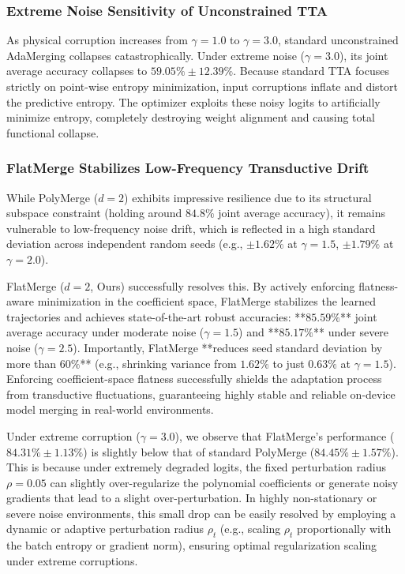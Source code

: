 \subsubsection{Extreme Noise Sensitivity of Unconstrained TTA}
As physical corruption increases from $\gamma=1.0$ to $\gamma=3.0$, standard unconstrained AdaMerging collapses catastrophically. 
Under extreme noise ($\gamma=3.0$), its joint average accuracy collapses to $59.05\% \pm 12.39\%$. 
Because standard TTA focuses strictly on point-wise entropy minimization, input corruptions inflate and distort the predictive entropy. 
The optimizer exploits these noisy logits to artificially minimize entropy, completely destroying weight alignment and causing total functional collapse.

\subsubsection{FlatMerge Stabilizes Low-Frequency Transductive Drift}
While PolyMerge ($d=2$) exhibits impressive resilience due to its structural subspace constraint (holding around $84.8\%$ joint average accuracy), it remains vulnerable to low-frequency noise drift, which is reflected in a high standard deviation across independent random seeds (e.g., $\pm 1.62\%$ at $\gamma=1.5$, $\pm 1.79\%$ at $\gamma=2.0$).

FlatMerge ($d=2$, Ours) successfully resolves this. 
By actively enforcing flatness-aware minimization in the coefficient space, FlatMerge stabilizes the learned trajectories and achieves state-of-the-art robust accuracies: **$85.59\%$** joint average accuracy under moderate noise ($\gamma=1.5$) and **$85.17\%$** under severe noise ($\gamma=2.5$). 
Importantly, FlatMerge **reduces seed standard deviation by more than $60\%$** (e.g., shrinking variance from $1.62\%$ to just $0.63\%$ at $\gamma=1.5$). 
Enforcing coefficient-space flatness successfully shields the adaptation process from transductive fluctuations, guaranteeing highly stable and reliable on-device model merging in real-world environments.

Under extreme corruption ($\gamma=3.0$), we observe that FlatMerge's performance ($84.31\% \pm 1.13\%$) is slightly below that of standard PolyMerge ($84.45\% \pm 1.57\%$). 
This is because under extremely degraded logits, the fixed perturbation radius $\rho = 0.05$ can slightly over-regularize the polynomial coefficients or generate noisy gradients that lead to a slight over-perturbation. 
In highly non-stationary or severe noise environments, this small drop can be easily resolved by employing a dynamic or adaptive perturbation radius $\rho_t$ (e.g., scaling $\rho_t$ proportionally with the batch entropy or gradient norm), ensuring optimal regularization scaling under extreme corruptions.

